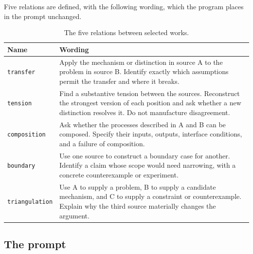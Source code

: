 \documentclass[11pt]{article}
\begin{document}
Five relations are defined, with the following wording, which the program places in the prompt unchanged.

\begin{table}[h]
\centering
\small
\begin{tabular}{|p{2.4cm}|p{11.6cm}|}
\hline
\textbf{Name} & \textbf{Wording} \\ \hline
\texttt{transfer} & Apply the mechanism or distinction in source A to the problem in source B. Identify exactly which assumptions permit the transfer and where it breaks. \\ \hline
\texttt{tension} & Find a substantive tension between the sources. Reconstruct the strongest version of each position and ask whether a new distinction resolves it. Do not manufacture disagreement. \\ \hline
\texttt{composition} & Ask whether the processes described in A and B can be composed. Specify their inputs, outputs, interface conditions, and a failure of composition. \\ \hline
\texttt{boundary} & Use one source to construct a boundary case for another. Identify a claim whose scope would need narrowing, with a concrete counterexample or experiment. \\ \hline
\texttt{triangulation} & Use A to supply a problem, B to supply a candidate mechanism, and C to supply a constraint or counterexample. Explain why the third source materially changes the argument. \\ \hline
\end{tabular}
\caption{The five relations between selected works.}
\label{tab:relations}
\end{table}

\subsection{The prompt}
\end{document}
